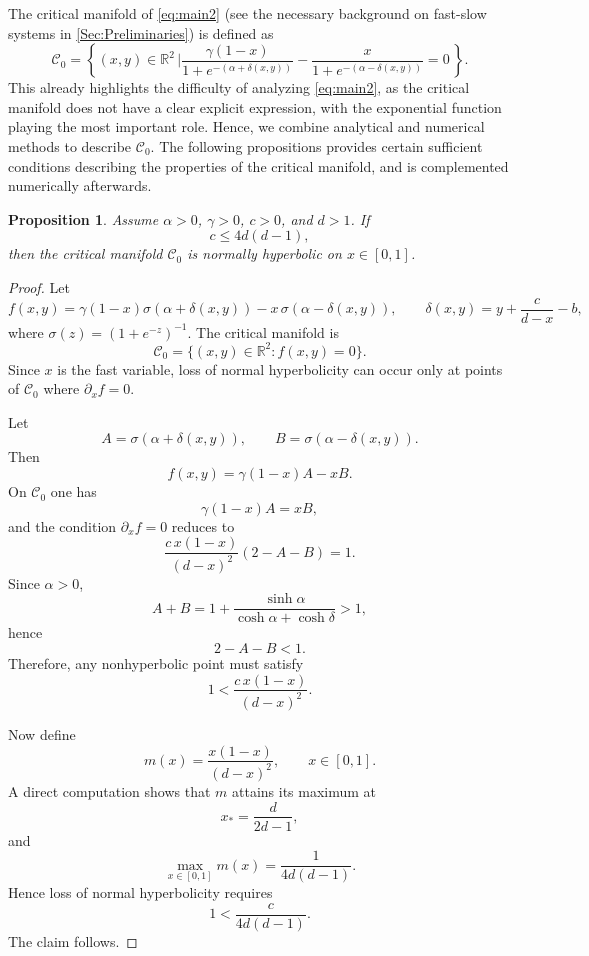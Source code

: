 \documentclass[3p]{elsarticle}
\theoremstyle{plain}
\newtheorem{proposition}{Proposition}[section]
\theoremstyle{remark}
\theoremstyle{definition}
\begin{document}
 The critical manifold of \eqref{eq:main2} (see the necessary background on fast-slow systems in \ref{Sec:Preliminaries}) is defined as
\begin{equation}\label{eq:C0}
    \mathcal{C}_0=\left\{ (x,y)\in\mathbb R^2\,|\frac{\gamma(1-x)}{1+e^{-(\alpha + \delta(x,y))}}  -    \frac{x}{1+e^{-(\alpha - \delta(x,y))}}=0\,\right\}.
\end{equation}
This already highlights the difficulty of analyzing \eqref{eq:main2}, as the critical manifold does not have a clear explicit expression, with the exponential function playing the most important role. Hence, we combine analytical and numerical methods to describe $\mathcal{C}_0$. The following propositions provides certain sufficient conditions describing the properties of the critical manifold, and is complemented numerically afterwards.
\begin{proposition}\label{prop:NH_simple}
Assume $\alpha>0$, $\gamma>0$, $c>0$, and $d>1$. If
\[
c\le 4d(d-1),
\]
then the critical manifold $\mathcal C_0$ is normally hyperbolic on $x\in[0,1]$.

\end{proposition}

\begin{proof}
Let
\[
f(x,y)=\gamma(1-x)\sigma(\alpha+\delta(x,y))-x\,\sigma(\alpha-\delta(x,y)),
\qquad
\delta(x,y)=y+\frac{c}{d-x}-b,
\]
where $\sigma(z)=(1+e^{-z})^{-1}$. The critical manifold is
\[
\mathcal C_0=\{(x,y)\in\mathbb R^2:f(x,y)=0\}.
\]
Since $x$ is the fast variable, loss of normal hyperbolicity can occur only at points of $\mathcal C_0$ where $\partial_x f=0$.

Let
\[
A=\sigma(\alpha+\delta(x,y)),
\qquad
B=\sigma(\alpha-\delta(x,y)).
\]
Then
\[
f(x,y)=\gamma(1-x)A-xB.
\]
On $\mathcal C_0$ one has
\[
\gamma(1-x)A=xB,
\]
and the condition $\partial_x f=0$ reduces to
\[
\frac{c\,x(1-x)}{(d-x)^2}(2-A-B)=1.
\]
Since $\alpha>0$,
\[
A+B
=
1+\frac{\sinh\alpha}{\cosh\alpha+\cosh\delta}
>1,
\]
hence
\[
2-A-B<1.
\]
Therefore, any nonhyperbolic point must satisfy
\begin{equation}\label{eq:cond_nh}
    1<\frac{c\,x(1-x)}{(d-x)^2}.
\end{equation}

Now define
\[
m(x)=\frac{x(1-x)}{(d-x)^2},
\qquad x\in[0,1].
\]
A direct computation shows that $m$ attains its maximum at
\[
x_*=\frac{d}{2d-1},
\]
and
\[
\max_{x\in[0,1]}m(x)=\frac{1}{4d(d-1)}.
\]
Hence loss of normal hyperbolicity requires
\[
1<\frac{c}{4d(d-1)}.
\]
The claim follows.
\end{proof}
\end{document}
